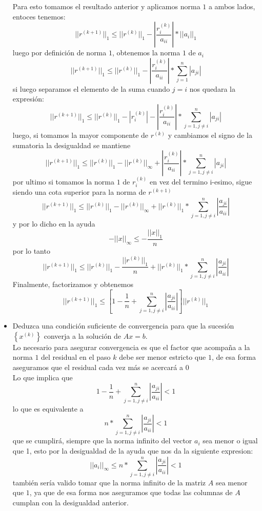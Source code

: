 \documentclass{article}
\begin{document}
\begin{itemize}
Para esto tomamos el resultado anterior y aplicamos norma $1$ a ambos lados, entoces tenemos:
$$||r^{(k+1)}||_{1} \leq ||r^{(k)}||_1 -\left|\frac{r_{i}^{(k)}}{a_{ii}}\right|*||a_i||_1$$
luego por definición de norma $1$, obtenemos la norma $1$ de $a_i$
$$||r^{(k+1)}||_{1} \leq ||r^{(k)}||_1 -\left|\frac{r_{i}^{(k)}}{a_{ii}}\right|*\sum_{j=1}^{n}|a_{ji}|$$
si luego separamos el elemento de la suma cuando $j=i$ nos quedara la expresión:
$$||r^{(k+1)}||_{1} \leq ||r^{(k)}||_1-|r_{i}^{(k)}| -\left|\frac{r_{i}^{(k)}}{a_{ii}}\right|*\sum_{j=1,j\neq i}^{n}|a_{ji}|$$
luego, si tomamos la mayor componente de $r^{(k)}$ y cambiamos el signo de la sumatoria la desigualdad se mantiene
$$||r^{(k+1)}||_{1} \leq ||r^{(k)}||_1-||r^{(k)}||_{\infty} +\left|\frac{r_{i}^{(k)}}{a_{ii}}\right|*\sum_{j=1,j\neq i}^{n}|a_{ji}|$$
por ultimo si tomamos la norma $1$ de $r_{i}^{(k)}$ en vez del termino i-esimo, sigue siendo una cota superior para la norma de $r^{(k+1)}$
$$||r^{(k+1)}||_{1} \leq ||r^{(k)}||_1-||r^{(k)}||_{\infty} +||r^{(k)}||_1*\sum_{j=1,j\neq i}^{n}\left|\frac{a_{ji}}{a_{ii}}\right|$$
y por lo dicho en la ayuda
$$-||x||_{\infty} \leq -\frac{||x||_1}{n}$$
por lo tanto 
$$||r^{(k+1)}||_{1} \leq ||r^{(k)}||_1-\frac{||r^{(k)}||_{1}}{n} +||r^{(k)}||_1*\sum_{j=1,j\neq i}^{n}\left|\frac{a_{ji}}{a_{ii}}\right|$$
Finalmente, factorizamos y obtenemos
$$||r^{(k+1)}||_1 \leq \left[1-\frac{1}{n}+ \sum_{j=1,j\neq i}^{n}\left|\frac{a_{ji}}{a_{ii}}\right| \right] ||r^{(k)}||_1 $$
\item Deduzca una condición suficiente de convergencia para que la sucesión $\left\lbrace x^{(k)}\right\rbrace$ converja a la solución de $Ax = b$.\\

Lo necesario para asegurar convergencia es que el factor que acompaña a la norma $1$ del residual en el paso $k$ debe ser menor estricto que $1$, de esa forma aseguramos que el residual cada vez más se acercará a $0$\\

Lo que implica que 
$$1-\frac{1}{n}+ \sum_{j=1,j\neq i}^{n}\left|\frac{a_{ji}}{a_{ii}}\right|<1 $$
lo que es equivalente a
$$n*\sum_{j=1,j\neq i}^{n}\left|\frac{a_{ji}}{a_{ii}}\right|<1 $$
que se cumplirá, siempre que la norma infinito del vector $a_i$ sea menor o igual que 1, esto por la desigualdad de la ayuda que nos da la siguiente expresion:
$$||a_i||_{\infty}\leq n*\sum_{j=1,j\neq i}^{n}\left|\frac{a_{ji}}{a_{ii}}\right|<1 $$
también sería valido tomar que la norma infinito de la matriz $A$ sea menor que $1$, ya que de esa forma nos aseguramos que todas las columnas de $A$ cumplan con la desigualdad anterior.
\end{itemize}
\end{document}
